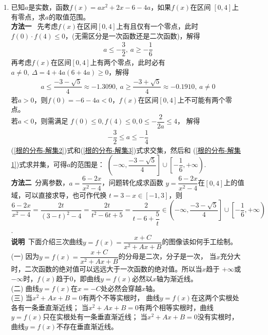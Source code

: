 \begin{enumerate}[label={【\textbf{例\thechapter.\arabic*}】},
 leftmargin=\inteval{\myenumleftmargin}pt,
 itemsep=\inteval{\myenumitempsep}pt,
 itemindent=\inteval{\myenumitemindent}pt]
\item 已知$ a $是实数，函数$ f(x)=ax^2+2x-6-4a $，如果$ f(x) $在区间
$ [0,4] $上有零点，求$ a $的取值范围。 \\
\textbf{方法一}\ 
 先考虑$ f(x) $在区间$ [0,4] $上有且仅有一个零点，此时$ f(0)\cdot 
f(4)\leq 0 $，(无需区分是一次函数还是二次函数)，解得
\begin{gather} \label{根的分布-解集1}
    a\leq -\dfrac{3}{2},\ a\geq -\dfrac{1}{6}
\end{gather}
 再考虑$ f(x) $在区间$ [0,4] $上有两个零点，此时必有
$ a\neq 0,\ \Delta=4+4a(6+4a)\geq 0 $，解得
\begin{gather} \label{根的分布-解集2}
    a\leq\dfrac{-3-\sqrt{5}}{4}\approx -1.3090,\ a\geq\dfrac{-3+\sqrt{5}}{4}
    \approx -0.1910,\ a\neq 0
\end{gather}
若$ a>0 $，则$ f(0)=-6-4a<0 $，$ f(x) $在区间$ [0,4] $上不可能有两个零点。\\
若$ a<0 $，则需满足 $ f(0)\leq 0, f(4)\leq 0, 0\leq -\dfrac{2}{2a} \leq 4 $，
解得
\begin{gather} \label{根的分布-解集3}
    -\dfrac{3}{2} \leq a \leq -\dfrac{1}{4}
\end{gather}
(\ref{根的分布-解集2})式和(\ref{根的分布-解集3})式求交集，然后和
(\ref{根的分布-解集1})式求并集，可得$ a $的范围是：
$ \left(-\infty,\dfrac{-3-\sqrt{5}}{4}\right]\cup 
\left[-\dfrac{1}{6},+\infty \right) $. 
\\ 
\textbf{方法二}\ 分离参数，$ a=\dfrac{6-2x}{x^2-4} $，问题转化成求函数
$ y=\dfrac{6-2x}{x^2-4} $在$ [0,4] $上的值域，可以直接求导，也可作代换
$ t=3-x\in[-1,3] $，则$ \dfrac{6-2x}{x^2-4}=\dfrac{2t}{(3-t)^2-4}=
\dfrac{2t}{t^2-6t+5}=\dfrac{2}{t-6+\dfrac{5}{t}} \in 
\left(-\infty,\dfrac{-3-\sqrt{5}}{4}\right]\cup 
\left[-\dfrac{1}{6},+\infty \right) $. \\
\textbf{说明}\ 下面介绍三次曲线$y=f(x)=\dfrac{x+C}{x^2+Ax+B}$的图像该如何手工绘制。\\
(一) 因为$y=f(x)=\dfrac{x+C}{x^2+Ax+B}$的分母是二次，分子是一次，
当$x$充分大时，二次函数的绝对值可以远远大于一次函数的绝对值。所以当$x$趋于
$+\infty$或$-\infty$时，$f(x)$趋于0，即曲线$y=f(x)$必然以$x$轴为渐近线。\\
(二) 曲线$y=f(x)$在$x=-C$处必然会穿越$x$轴。\\
(三) 当$x^2+Ax+B=0$有两个不等实根时，
曲线$y=f(x)$在这两个实根处各有一条垂直渐近线；
当$x^2+Ax+B=0$有两个相等实根时，曲线$y=f(x)$只在实根处有一条垂直渐近线；
当$x^2+Ax+B=0$没有实根时，曲线$y=f(x)$不存在垂直渐近线。\\

\end{enumerate}
